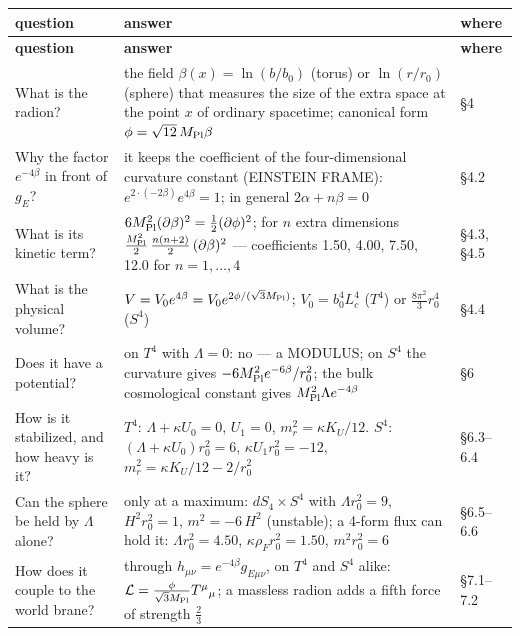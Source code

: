 \documentclass[10pt,a4paper]{article}
\begin{document}
{\small
\begin{longtable}{>{\raggedright\arraybackslash}p{}>{\raggedright\arraybackslash}p{}>{\raggedright\arraybackslash}p{}}
\toprule
\textbf{question} & \textbf{answer} & \textbf{where} \\
\midrule\endfirsthead
\toprule
\textbf{question} & \textbf{answer} & \textbf{where} \\
\midrule\endhead
\endfoot
\bottomrule\endlastfoot
What is the radion? & the field $\beta(x)=\ln(b/b_0)$ (torus) or $\ln(r/r_0)$ (sphere) that measures the size of the extra space at the point $x$ of ordinary spacetime; canonical form $\phi=\sqrt{12}\,M_{\rm Pl}\beta$ & §4 \\
Why the factor $e^{-4\beta}$ in front of $g_E$? & it keeps the coefficient of the four-dimensional curvature constant (EINSTEIN FRAME): $e^{2\cdot(-2\beta)}e^{4\beta}=1$; in general $2\alpha+n\beta=0$ & §4.2 \\
What is its kinetic term? & $6M_{\rm Pl}^2(\partial\beta)^2=\frac12(\partial\phi)^2$; for $n$ extra dimensions $\frac{M_{\rm Pl}^2}2\,\frac{n(n+2)}2\,(\partial\beta)^2$ — coefficients 1.50, 4.00, 7.50, 12.0 for $n=1,\dots,4$ & §4.3, §4.5 \\
What is the physical volume? & $V=V_0e^{4\beta}=V_0e^{2\phi/(\sqrt3M_{\rm Pl})}$; $V_0=b_0^4L_c^4$ ($T^4$) or $\frac{8\pi^2}3r_0^4$ ($S^4$) & §4.4 \\
Does it have a potential? & on $T^4$ with $\Lambda=0$: no — a MODULUS; on $S^4$ the curvature gives $-6M_{\rm Pl}^2e^{-6\beta}/r_0^2$; the bulk cosmological constant gives $M_{\rm Pl}^2\Lambda e^{-4\beta}$ & §6 \\
How is it stabilized, and how heavy is it? & $T^4$: $\Lambda+\kappa U_0=0$, $U_1=0$, $m_r^2=\kappa K_U/12$. $S^4$: $(\Lambda+\kappa U_0)r_0^2=6$, $\kappa U_1r_0^2=-12$, $m_r^2=\kappa K_U/12-2/r_0^2$ & §6.3–6.4 \\
Can the sphere be held by $\Lambda$ alone? & only at a maximum: $dS_4\times S^4$ with $\Lambda r_0^2=9$, $H^2r_0^2=1$, $m^2=-6\,H^2$ (unstable); a 4-form flux can hold it: $\Lambda r_0^2=4.50$, $\kappa\rho_Fr_0^2=1.50$, $m^2r_0^2=6$ & §6.5–6.6 \\
How does it couple to the world brane? & through $h_{\mu\nu}=e^{-4\beta}g_{E\mu\nu}$, on $T^4$ and $S^4$ alike: $\mathcal L=\frac{\phi}{\sqrt3M_{\rm Pl}}T^\mu{}_\mu$; a massless radion adds a fifth force of strength $\frac23$ & §7.1–7.2 \\

\end{longtable}}
\end{document}
